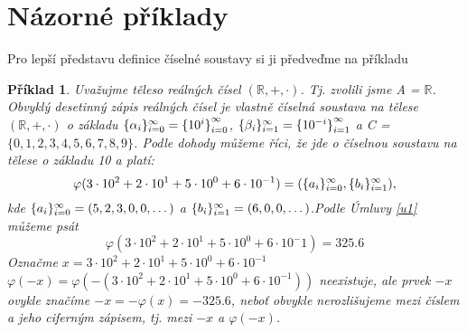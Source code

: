 \documentclass[12pt]{book}
\newtheorem*{pr}{Příklad}
\begin{document}
\newpage
\section{Názorné příklady}
Pro lepší představu definice číselné soustavy si ji předveďme na příkladu
\begin{pr}
	Uvažujme těleso reálných čísel $(\mathbb{R},+,\cdot)$. Tj. zvolili jsme A = $\mathbb{R}$. Obvyklý desetinný zápis reálných čísel je vlastně číselná soustava na tělese $(\mathbb{R},+,\cdot)$ o základu $\{\alpha_i\}_{i=0}^{\infty}=\{{10^i\}}_{i=0}^{\infty}$, $\{\beta_i\}_{i=1}^{\infty}=\{{10^{-i}\}}_{i=1}^{\infty}$ a C = $\{0,1,2,3,4,5,6,7,8,9\}$. Podle dohody můžeme říci, že jde o číselnou soustavu na tělese o základu 10 a platí:
	$$\varphi(3\cdot10^2+2\cdot10^1+5\cdot10^0+6\cdot10^{-1})=(\{a_i\}_{i=0}^{\infty},\{b_i\}_{i=1}^{\infty}),$$kde
	$\{a_i\}_{i=0}^{\infty}=(5,2,3,0,0,\dots)$ a $\{b_i\}_{i=1}^{\infty} = (6,0,0,\dots)$.\newline Podle Úmluvy \ref{u1} můžeme psát $$\varphi(3\cdot10^2+2\cdot10^1+5\cdot10^0+6\cdot10^-1)=325.6$$
	Označme $x=3\cdot10^2+2\cdot10^1+5\cdot10^0+6\cdot10^{-1}$\newline
	$\varphi(-x) = \varphi(-(3\cdot10^2+2\cdot10^1+5\cdot10^0+6\cdot10^{-1}))$ neexistuje, ale prvek $-x$ ovykle značíme $-x=-\varphi(x)=-325.6$, neboť obvykle nerozlišujeme mezi číslem a jeho ciferným zápisem, tj. mezi $-x$ a $\varphi(-x)$.
	
	
\end{pr}
\end{document}
